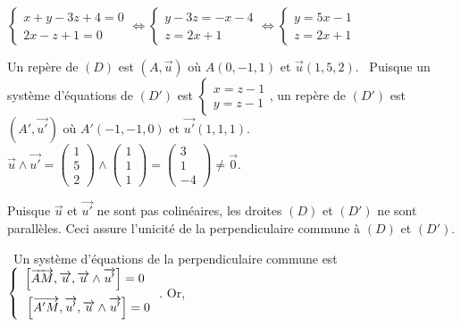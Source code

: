 \documentclass[11pt,a4paper]{article}
\begin{document}
\begin{center}
$\left\{
\begin{array}{l}
x+y-3z+4=0\\
2x-z+1=0
\end{array}
\right.\Leftrightarrow\left\{
\begin{array}{l}
y-3z=-x-4\\
z=2x+1
\end{array}
\right.\Leftrightarrow\left\{
\begin{array}{l}
y=5x-1\\
z=2x+1
\end{array}
\right.$
\end{center}
Un repère de $(D)$ est $\left(A,\overrightarrow{u}\right)$ où $A(0,-1,1)$ et $\overrightarrow{u}(1,5,2)$.
\textbullet~Puisque un système d'équations de $(D')$ est $\left\{
\begin{array}{l}
x=z-1\\
y=z-1
\end{array}
\right.$, un repère de $(D')$ est $\left(A',\overrightarrow{u'}\right)$ où $A'(-1,-1,0)$ et $\overrightarrow{u'}(1,1,1)$.
\textbullet~$\overrightarrow{u}\wedge\overrightarrow{u'}=\left(
\begin{array}{c}
1\\
5\\
2
\end{array}
\right)\wedge\left(
\begin{array}{c}
1\\
1\\
1
\end{array}
\right)=\left(
\begin{array}{c}
3\\
1\\
-4
\end{array}
\right)\neq\overrightarrow{0}$.
\rule{0mm}{5mm}Puisque $\overrightarrow{u}$ et $\overrightarrow{u'}$ ne sont pas colinéaires, les droites $(D)$ et $(D')$ ne sont parallèles. Ceci assure l'unicité de la perpendiculaire commune  à $(D)$ et $(D')$.

\textbullet~Un système d'équations de la perpendiculaire commune est 
$\left\{
\begin{array}{l}
\left[\overrightarrow{AM},\overrightarrow{u},\overrightarrow{u}\wedge\overrightarrow{u'}\right]=0\\
\rule{0mm}{6mm}\left[\overrightarrow{A'M},\overrightarrow{u'},\overrightarrow{u}\wedge\overrightarrow{u'}\right]=0
\end{array}
\right.$. Or,
\end{document}

